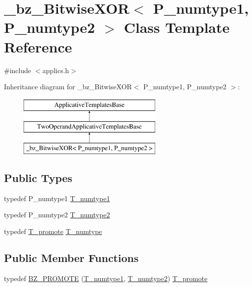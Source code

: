 \hypertarget{class__bz__BitwiseXOR}{}\section{\+\_\+bz\+\_\+\+Bitwise\+X\+O\+R$<$ P\+\_\+numtype1, P\+\_\+numtype2 $>$ Class Template Reference}
\label{class__bz__BitwiseXOR}


{\ttfamily \#include $<$applics.\+h$>$}

Inheritance diagram for \+\_\+bz\+\_\+\+Bitwise\+X\+O\+R$<$ P\+\_\+numtype1, P\+\_\+numtype2 $>$\+:\begin{figure}[H]
\begin{center}
\leavevmode
\includegraphics[height=3.000000cm]{class__bz__BitwiseXOR}
\end{center}
\end{figure}
\subsection*{Public Types}
\begin{DoxyCompactItemize}
\item 
typedef P\+\_\+numtype1 \hyperlink{class__bz__BitwiseXOR_a4e7363bbe2dcf25627569307102acc14}{T\+\_\+numtype1}
\item 
typedef P\+\_\+numtype2 \hyperlink{class__bz__BitwiseXOR_ad8ea4ae9bf0ad007b9f739ab6d874e7a}{T\+\_\+numtype2}
\item 
typedef \hyperlink{minmax_8h_aaa88a440c2f0d00798d5b1d42c79308d}{T\+\_\+promote} \hyperlink{class__bz__BitwiseXOR_a1988b438bfd839be85a9b73ad7c3be6b}{T\+\_\+numtype}
\end{DoxyCompactItemize}
\subsection*{Public Member Functions}
\begin{DoxyCompactItemize}
\item 
typedef \hyperlink{class__bz__BitwiseXOR_a5243a81511568cf684a3b795cb1f5c4a}{B\+Z\+\_\+\+P\+R\+O\+M\+O\+T\+E} (\hyperlink{class__bz__BitwiseXOR_a4e7363bbe2dcf25627569307102acc14}{T\+\_\+numtype1}, \hyperlink{class__bz__BitwiseXOR_ad8ea4ae9bf0ad007b9f739ab6d874e7a}{T\+\_\+numtype2}) \hyperlink{minmax_8h_aaa88a440c2f0d00798d5b1d42c79308d}{T\+\_\+promote}
\end{DoxyCompactItemize}
